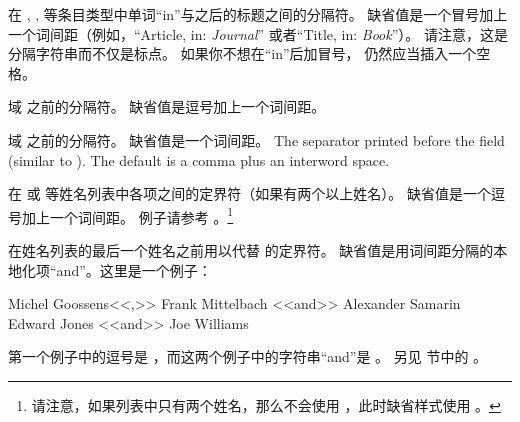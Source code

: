 \begin{ltxsyntax}
在 , ,  等条目类型中单词“in”与之后的标题之间的分隔符。
缺省值是一个冒号加上一个词间距（例如，“Article, in: \emph{Journal}” 或者“Title, in: \emph{Book}”）。
请注意，这是分隔字符串而不仅是标点。
如果你不想在“in”后加冒号， 仍然应当插入一个空格。

域  之前的分隔符。
缺省值是逗号加上一个词间距。

域  之前的分隔符。
缺省值是一个词间距。
The separator printed before the  field (similar to ). The default is a comma plus an interword space.

\CSdelimMark
在  或  等姓名列表中各项之间的定界符（如果有两个以上姓名）。
缺省值是一个逗号加上一个词间距。
例子请参考 。\footnote{%
	请注意，如果列表中只有两个姓名，那么不会使用 ，此时缺省样式使用 。
}

\CSdelimMark
在姓名列表的最后一个姓名之前用以代替  的定界符。
缺省值是用词间距分隔的本地化项“and”。这里是一个例子：

\begin{ltxexample}
Michel Goossens<<,>> Frank Mittelbach <<and>> Alexander Samarin
Edward Jones <<and>> Joe Williams
\end{ltxexample}
%
第一个例子中的逗号是 ，而这两个例子中的字符串“and”是 。
另见  节中的 。


\end{ltxsyntax}
